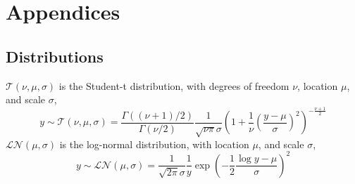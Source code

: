 \documentclass[11pt, oneside, article]{memoir}
\newcommand{\dist}[1]{\mathcal{#1}}
\newcommand{\paren}[1]{\mathopen{}\left(#1\right)\mathclose{}}
\newcommand{\disti}[2]{\ensuremath{\dist{#1}\paren{#2}}}
\newcommand{\dlnorm}[1]{\disti{LN}{#1}}
\newcommand{\dt}[1]{\disti{T}{#1}}
\begin{document}
\newpage

\section{Appendices}
\label{sec:appendix}

\subsection{Distributions}

$\dt{\nu, \mu, \sigma}$ is the Student-t distribution, with degrees of freedom $\nu$, location $\mu$, and scale $\sigma$,
\begin{equation}
  \label{eq:8}
  y \sim \dt{\nu, \mu, \sigma} = \frac{\Gamma((\nu + 1) / 2)}{\Gamma(\nu / 2)} \frac{1}{\sqrt{\nu \pi} \sigma} 
  \left(
    1 + \frac{1}{\nu}
    \left(
      \frac{y - \mu}{\sigma}
    \right)^{2}
  \right)^{-\frac{\nu + 1}{2}}
\end{equation}
$\dlnorm{\mu, \sigma}$ is the log-normal distribution, with location $\mu$, and scale $\sigma$,
\begin{equation}
  \label{eq:7}
  y \sim \dlnorm{\mu, \sigma} = \frac{1}{\sqrt{2 \pi} \sigma} \frac{1}{y} \exp
  \left(
    - \frac{1}{2} \frac{\log y - \mu}{\sigma}
  \right)^{2}
\end{equation}

\printbibliography{}
\end{document}
